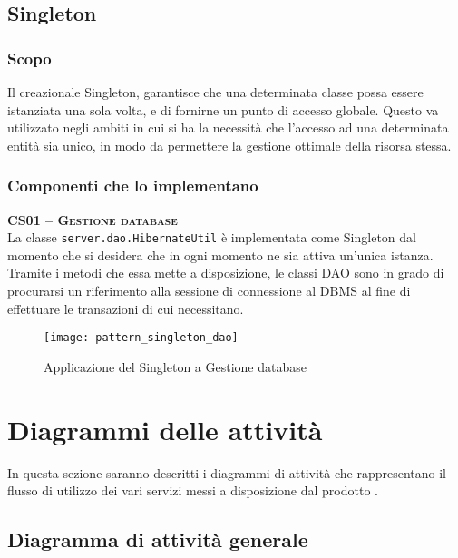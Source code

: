 \subsection{Singleton}

\subsubsection{Scopo}
Il  creazionale Singleton, garantisce che una determinata classe possa essere istanziata una sola volta, e di fornirne un punto di accesso globale. Questo  va utilizzato negli ambiti in cui si ha la necessità che l'accesso ad una determinata entità sia unico, in modo da permettere la gestione ottimale della risorsa stessa.

\subsubsection{Componenti che lo implementano}
\begin{description}
  \item{\scshape\bfseries CS01 -- Gestione database}\\
La classe \texttt{server.dao.HibernateUtil} è implementata come Singleton dal momento che si desidera che in ogni momento ne sia attiva un'unica istanza. Tramite i metodi che essa mette a disposizione, le classi DAO sono in grado di procurarsi un riferimento alla sessione di connessione al DBMS al fine di effettuare le transazioni di cui necessitano.

\begin{figure}[H]
  \centering
  \texttt{[image: pattern\_singleton\_dao]}
  \caption{Applicazione del  Singleton a \textsf{Gestione database}}\label{fig:singleton2}
\end{figure}

\end{description}
\clearpage

\section{Diagrammi delle attività}
In questa sezione saranno descritti i diagrammi di attività che rappresentano il flusso di utilizzo dei vari servizi messi a disposizione dal prodotto \caName.

\subsection{Diagramma di attività generale}

